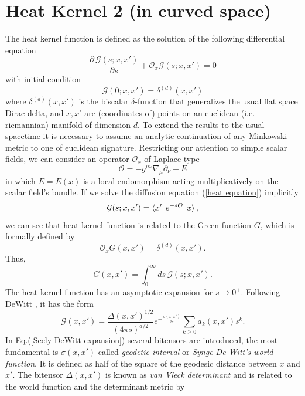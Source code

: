 \chapter{Heat Kernel 2 (in curved space)}
 The heat kernel function is defined as the solution of the following differential equation
\begin{equation}\label{heat equation}
        \frac{\partial\,\mathcal{G}(s;x,x')}{\partial s} + \mathcal{O}_x\mathcal{G}(s;x,x')=0
\end{equation}
with initial condition
\begin{equation}
    \mathcal{G}(0;x,x')=\delta^{(d)}(x,x')
\end{equation}
where $\delta^{(d)}(x,x')$ is the biscalar $\delta$-function that generalizes the usual flat space Dirac delta, and $x,x'$ are (coordinates of) points on an euclidean (i.e. riemannian) manifold of dimension $d$. To extend the results to the usual spacetime it is necessary to assume an analytic continuation of any Minkowski metric to one of euclidean signature.
Restricting our attention to simple scalar fields, we can consider an operator $\mathcal{O}_x$ of Laplace-type
\begin{equation}\label{Laplace-type operator}
    \mathcal{O} = - g^{\mu\nu}\nabla_\mu \partial_\nu + E
\end{equation}
in which $E=E(x)$ is a local endomorphism acting multiplicatively on the scalar field's bundle. If we solve the diffusion equation (\ref{heat equation}) implicitly
\begin{equation}
\mathcal{G}(s;x,x')= \bra{x'}e^{-s\mathcal{O}}\ket{x},
\end{equation}
we can see that heat kernel function is related to the Green function $G$, which is formally defined by
\begin{equation}
    \mathcal{O}_x G(x,x')= \delta^{(d)}(x,x').
\end{equation}
Thus,
\begin{equation}
    G(x,x')= \int_0^\infty ds\,\mathcal{G}(s;x,x').
\end{equation}
The heat kernel function has an asymptotic expansion for $s \xrightarrow{} 0^+$. Following DeWitt \cite{DeWitt:1964mxt}, it has the form
\begin{equation}\label{Seely-DeWitt expansion}
    \mathcal{G}(x,x') = \frac{\Delta(x,x')^{1/2}}{(4 \pi s)^{d/2}} e ^{-\frac{\sigma(x,x')}{2s}}\sum_{k \geq 0} a_k (x,x') s^k.
\end{equation}
In Eq.(\ref{Seely-DeWitt expansion}) several bitensors are introduced, the most fundamental is $\sigma(x,x')$ called \emph{geodetic interval} or \emph{Synge-De Witt's world function}. It is defined as half of the square of the geodesic distance between $x$ and $x'$. The bitensor $\Delta(x,x')$ is known as \emph{van Vleck determinant} and is related to the world function and the determinant metric by
